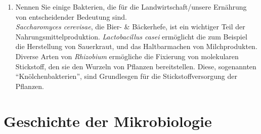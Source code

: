 \begin{enumerate}
	\item Nennen Sie einige Bakterien, die für die Landwirtschaft/unsere Ernährung von entscheidender Bedeutung sind. \hfill \\
	
	\emph{Saccharomyces cerevisae}, die Bier- \& Bäckerhefe,
	ist ein wichtiger Teil der Nahrungsmittelproduktion.
	\emph{Lactobacillus casei} ermöglicht die zum Beispiel die Herstellung von Sauerkraut,
	und das Haltbarmachen von Milchprodukten.
	Diverse Arten von \emph{Rhizobium} ermögliche die Fixierung von molekularen Stickstoff,
	den sie den Wurzeln von Pflanzen bereitstellen.
	Diese, sogenannten ``Knölchenbakterien'', sind Grundlesgen für die Stickstoffversorgung der Pflanzen.
\end{enumerate}

\section{Geschichte der Mikrobiologie}
